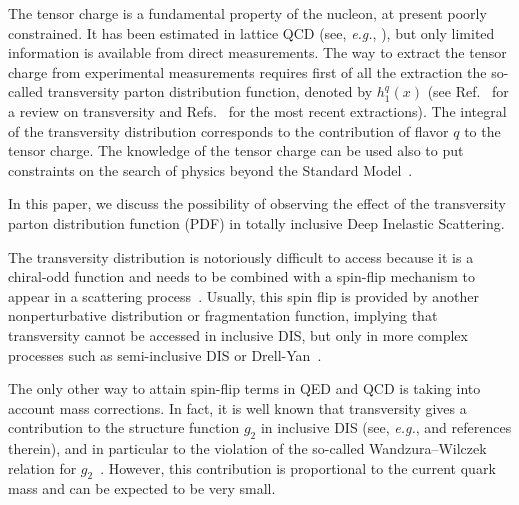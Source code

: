 \documentclass[preprintnumbers,floatfix,nofootinbib]{revtex4}
\newcommand{\eg}{{\em e.g.}}
\begin{document}
The tensor charge is a fundamental property of the nucleon, at
present poorly constrained. It has been estimated in lattice
QCD (see, \eg,
\cite{Green:2012ej,Bali:2014nma,Bhattacharya:2015wna,Abdel-Rehim:2015owa,Bhattacharya:2016zcn}), but
only limited information is available from direct measurements. The
way to extract the tensor charge from experimental measurements requires first
of all the extraction the so-called transversity parton distribution function,
denoted by $h_1^q(x)$ (see Ref.~\cite{Barone:2001sp} for a review on transversity and
Refs.~\cite{Radici:2015mwa,Anselmino:2015sxa,Kang:2015msa} for the most recent
extractions). 
The integral of the transversity distribution
corresponds to the contribution of flavor $q$ to the tensor charge.
The knowledge of the tensor charge can be used also to put constraints on the search of physics beyond the Standard
Model~\cite{Cirigliano:2013xha,Bhattacharya:2015esa,Courtoy:2015haa}.

In this paper, we discuss the possibility of observing the effect of
the transversity parton distribution function (PDF) in totally inclusive Deep Inelastic Scattering.

The transversity distribution is notoriously difficult to access because it is
a chiral-odd function and needs to be combined with a spin-flip mechanism to
appear in a scattering process~\cite{Jaffe:1996zw}. Usually, this spin flip is provided by another
nonperturbative distribution or fragmentation function, implying that
transversity cannot be accessed in inclusive DIS,
but only in more complex processes such as semi-inclusive DIS or Drell-Yan~\cite{Ralston:1979ys,Jaffe:1991kp,Jaffe:1993xb,Collins:1993kk}. 

The only other way to attain spin-flip terms in QED and QCD is taking into
account mass corrections. In fact, it is well known that transversity gives a
contribution to the structure function $g_2$ in inclusive DIS (see, \eg,
\cite{Accardi:2009au} and references therein), and in
particular to the violation of the so-called Wandzura--Wilczek relation for
$g_2$~\cite{Wandzura:1977qf}. However, this contribution is proportional to the current quark mass
and can be expected to be very small.
\end{document}
